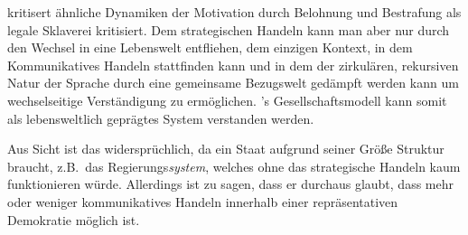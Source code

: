 \citeauthor{Dewey2010} kritisert ähnliche Dynamiken der Motivation durch Belohnung und Bestrafung als legale Sklaverei kritisiert.
Dem strategischen Handeln kann man aber nur durch den Wechsel in eine Lebenswelt entfliehen, dem einzigen Kontext, in dem Kommunikatives Handeln stattfinden kann und in dem der zirkulären, rekursiven Natur der Sprache durch eine gemeinsame Bezugswelt gedämpft werden kann um wechselseitige Verständigung zu ermöglichen.
\citeauthor{Dewey2010}'s Gesellschaftsmodell kann somit als lebensweltlich geprägtes System verstanden werden.

Aus \citeauthor{Habermas-1998-aa} Sicht ist das widersprüchlich, da ein Staat aufgrund seiner Größe Struktur braucht, z.B.\ das Regierungs\emph{system}, welches ohne das strategische Handeln kaum funktionieren würde.
Allerdings ist zu sagen, dass er durchaus glaubt, dass mehr oder weniger kommunikatives Handeln innerhalb einer repräsentativen Demokratie möglich ist.

